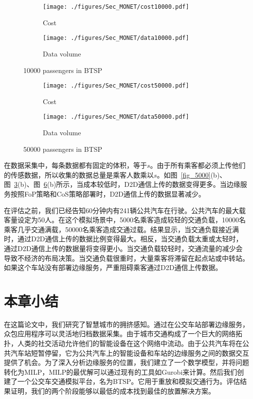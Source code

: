 \begin{figure}[!h]
  \centering
  \begin{subfigure}[b]{0.45\linewidth}
    \texttt{[image: ./figures/Sec\_MONET/cost10000.pdf]}
    \label{fig_cost10000}
    \caption{Cost}
  \end{subfigure}
  \begin{subfigure}[b]{0.45\linewidth}
    \texttt{[image: ./figures/Sec\_MONET/data10000.pdf]}
    \label{fig_data10000}
    \caption{Data volume}
  \end{subfigure}
  \caption{10000 passengers in BTSP}
  \label{fig_10000}
\end{figure}

\begin{figure}[!h]
  \centering
  \begin{subfigure}[b]{0.45\linewidth}
    \texttt{[image: ./figures/Sec\_MONET/cost50000.pdf]}
    \label{fig_cost50000}
    \caption{Cost}
  \end{subfigure}
  \begin{subfigure}[b]{0.45\linewidth}
    \texttt{[image: ./figures/Sec\_MONET/data50000.pdf]}
    \label{fig_data50000}
    \caption{Data volume}
  \end{subfigure}
  \caption{50000 passengers in BTSP}
  \label{fig_50000}
\end{figure}

在数据采集中，每条数据都有固定的体积，等于$s$。由于所有乘客都必须上传他们的传感数据，所以收集的数据总量是乘客人数乘以$s$。如图~\ref{fig_5000}(b)、图~\ref{fig_10000}(b)、图~\ref{fig_50000}(b)所示，当成本较低时，D2D通信上传的数据变得更多。当边缘服务按照FoP策略和CoS策略部署时，D2D通信上传的数据显著减少。

在评估之前，我们已经告知60分钟内有241辆公共汽车在行驶。公共汽车的最大载客量设定为50人。在这个模拟场景中，5000名乘客造成较轻的交通负载，10000名乘客几乎交通满载，50000名乘客造成交通过载。结果显示，当交通负载接近满时，通过D2D通信上传的数据比例变得最大。相反，当交通负载太重或太轻时，通过D2D通信上传的数据量将变得更小。当交通负载较轻时，交通流量的减少会导致不经济的布局决策。当交通负载很重时，大量乘客将滞留在起点站或中转站。如果这个车站没有部署边缘服务，严重阻碍乘客通过D2D通信上传数据。

\section{本章小结}

在这篇论文中，我们研究了智慧城市的拥挤感知。通过在公交车站部署边缘服务，众包应用程序可以灵活地归档数据采集。由于城市交通构成了一个巨大的网络拓扑，人类的社交活动允许他们的智能设备在这个网络中流动。由于公共汽车将在公共汽车站短暂停留，它为公共汽车上的智能设备和车站的边缘服务之间的数据交互提供了机会。为了深入分析边缘服务的位置，我们建立了一个数学模型，并将问题转化为MILP，MILP的最优解可以通过现有的工具如Gurobi来计算。然后我们创建了一个公交车交通模拟平台，名为BTSP。它用于重放和模拟交通行为。评估结果证明，我们的两个阶段能够以最低的成本找到最佳的放置解决方案。

